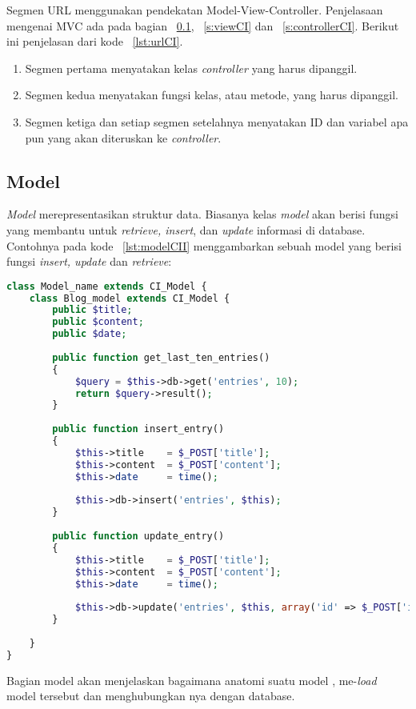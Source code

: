 \noindent Segmen URL menggunakan pendekatan Model-View-Controller. Penjelasaan mengenai MVC ada pada bagian ~\ref{s:modelCI}, ~\ref{s:viewCI} dan ~\ref{s:controllerCI}. Berikut ini penjelasan dari kode ~\ref{lst:urlCI}.
\begin{enumerate}
	\item Segmen pertama menyatakan kelas \textit{controller} yang harus dipanggil.
	\item Segmen kedua menyatakan fungsi kelas, atau metode, yang harus dipanggil.
	\item Segmen ketiga dan setiap segmen setelahnya menyatakan ID dan variabel apa pun yang akan diteruskan ke \textit{controller}.
\end{enumerate}

\subsection{Model}
\label{s:modelCI}
\textit{Model} merepresentasikan struktur data. Biasanya kelas \textit {model} akan berisi fungsi yang membantu untuk \textit{retrieve, insert}, dan \textit{update} informasi di database. Contohnya pada kode ~\ref{lst:modelCII} menggambarkan sebuah model yang berisi fungsi \textit{insert, update} dan \textit{retrieve}:

\begin{lstlisting}[style=customphp, language=PHP, basicstyle=\ttfamily, frame=single, columns=fullflexible, keepspaces=true, breaklines=true, showstringspaces=false, label={lst:modelCII}, caption=Struktur model pada codeIgniter.]  
class Model_name extends CI_Model {
	class Blog_model extends CI_Model {	
		public $title;
		public $content;
		public $date;
		
		public function get_last_ten_entries()
		{
			$query = $this->db->get('entries', 10);
			return $query->result();
		}
		
		public function insert_entry()
		{
			$this->title    = $_POST['title']; 
			$this->content  = $_POST['content'];
			$this->date     = time();
			
			$this->db->insert('entries', $this);
		}
		
		public function update_entry()
		{
			$this->title    = $_POST['title'];
			$this->content  = $_POST['content'];
			$this->date     = time();
			
			$this->db->update('entries', $this, array('id' => $_POST['id']));
		}
	
	}
}
\end{lstlisting}
Bagian model akan menjelaskan bagaimana anatomi suatu model , me-\textit{load} model tersebut  dan menghubungkan nya dengan database.

